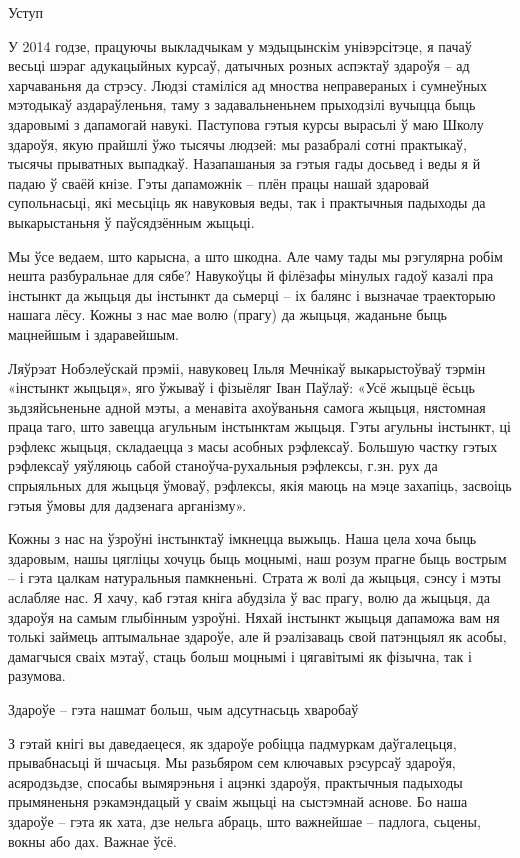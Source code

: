 Уступ


У 2014 годзе, працуючы выкладчыкам у мэдыцынскім унівэрсітэце, я пачаў весьці шэраг адукацыйных курсаў, датычных розных аспэктаў здароўя – ад харчаваньня да стрэсу. Людзі стаміліся ад мноства неправераных і сумнеўных мэтодыкаў аздараўленьня, таму з задавальненьнем прыходзілі вучыцца быць здаровымі з дапамогай навукі. Паступова гэтыя курсы вырасьлі ў маю Школу здароўя, якую прайшлі ўжо тысячы людзей: мы разабралі сотні практыкаў, тысячы прыватных выпадкаў. Назапашаныя за гэтыя гады досьвед і веды я й падаю ў сваёй кнізе. Гэты дапаможнік – плён працы нашай здаровай супольнасьці, які месьціць як навуковыя веды, так і практычныя падыходы да выкарыстаньня ў паўсядзённым жыцьці.

Мы ўсе ведаем, што карысна, а што шкодна. Але чаму тады мы рэгулярна робім нешта разбуральнае для сябе? Навукоўцы й філёзафы мінулых гадоў казалі пра інстынкт да жыцьця ды інстынкт да сьмерці – іх балянс і вызначае траекторыю нашага лёсу. Кожны з нас мае волю (прагу) да жыцьця, жаданьне быць мацнейшым і здаравейшым.

Ляўрэат Нобэлеўскай прэміі, навуковец Ільля Мечнікаў выкарыстоўваў тэрмін «інстынкт жыцьця», яго ўжываў і фізыёляг Іван Паўлаў: «Усё жыцьцё ёсьць зьдзяйсьненьне адной мэты, а менавіта ахоўваньня самога жыцьця, нястомная праца таго, што завецца агульным інстынктам жыцьця. Гэты агульны інстынкт, ці рэфлекс жыцьця, складаецца з масы асобных рэфлексаў. Большую частку гэтых рэфлексаў уяўляюць сабой станоўча-рухальныя рэфлексы, г.зн. рух да спрыяльных для жыцьця ўмоваў, рэфлексы, якія маюць на мэце захапіць, засвоіць гэтыя ўмовы для дадзенага арганізму».

Кожны з нас на ўзроўні інстынктаў імкнецца выжыць. Наша цела хоча быць здаровым, нашы цягліцы хочуць быць моцнымі, наш розум прагне быць вострым – і гэта цалкам натуральныя памкненьні. Страта ж волі да жыцьця, сэнсу і мэты аслабляе нас. Я хачу, каб гэтая кніга абудзіла ў вас прагу, волю да жыцьця, да здароўя на самым глыбінным узроўні. Няхай інстынкт жыцьця дапаможа вам ня толькі займець аптымальнае здароўе, але й рэалізаваць свой патэнцыял як асобы, дамагчыся сваіх мэтаў, стаць больш моцнымі і цягавітымі як фізычна, так і разумова.


Здароўе – гэта нашмат больш, чым адсутнасьць хваробаў


З гэтай кнігі вы даведаецеся, як здароўе робіцца падмуркам даўгалецьця, прывабнасьці й шчасьця. Мы разьбяром сем ключавых рэсурсаў здароўя, асяродзьдзе, спосабы вымярэньня і ацэнкі здароўя, практычныя падыходы прымяненьня рэкамэндацый у сваім жыцьці на сыстэмнай аснове. Бо наша здароўе – гэта як хата, дзе нельга абраць, што важнейшае – падлога, сьцены, вокны або дах. Важнае ўсё.

